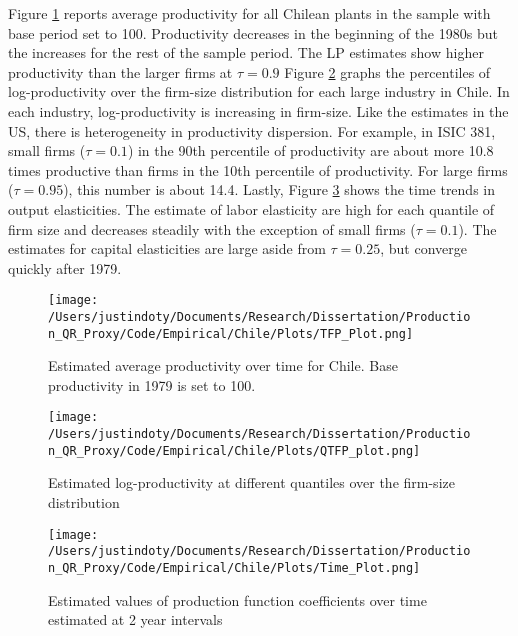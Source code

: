 \documentclass[11pt]{article}
\begin{document}
Figure \ref{fig:CHLpgrowth} reports average productivity for all Chilean plants in the sample with base period set to 100. Productivity decreases in the beginning of the 1980s but the increases for the rest of the sample period. The LP estimates show higher productivity than the larger firms at $\tau=0.9$ Figure \ref{fig:CHLpdisp} graphs the percentiles of log-productivity over the firm-size distribution for each large industry in Chile. In each industry, log-productivity is increasing in firm-size. Like the estimates in the US, there is heterogeneity in productivity dispersion. For example, in ISIC 381, small firms ($\tau=0.1$) in the 90th percentile of productivity are about more 10.8 times productive than firms in the 10th percentile of productivity. For large firms ($\tau=0.95$), this number is about 14.4. Lastly, Figure \ref{fig:CHLtimecoef} shows the time trends in output elasticities. The estimate of labor elasticity are high for each quantile of firm size and decreases steadily with the exception of small firms ($\tau=0.1$). The estimates for capital elasticities are large aside from $\tau=0.25$, but converge quickly after 1979. 

\begin{figure}[H]
\centering
\texttt{[image: /Users/justindoty/Documents/Research/Dissertation/Production\_QR\_Proxy/Code/Empirical/Chile/Plots/TFP\_Plot.png]}
\caption{Estimated average productivity over time for Chile. Base productivity in 1979 is set to 100.}
\label{fig:CHLpgrowth}
\end{figure}

\begin{figure}[H]
\centering
\texttt{[image: /Users/justindoty/Documents/Research/Dissertation/Production\_QR\_Proxy/Code/Empirical/Chile/Plots/QTFP\_plot.png]}
\caption{Estimated log-productivity at different quantiles over the firm-size distribution}
\label{fig:CHLpdisp}
\end{figure}

\begin{figure}[H]
\centering
\texttt{[image: /Users/justindoty/Documents/Research/Dissertation/Production\_QR\_Proxy/Code/Empirical/Chile/Plots/Time\_Plot.png]}
\caption{Estimated values of production function coefficients over time estimated at 2 year intervals}
\label{fig:CHLtimecoef}
\end{figure}


\end{document}
